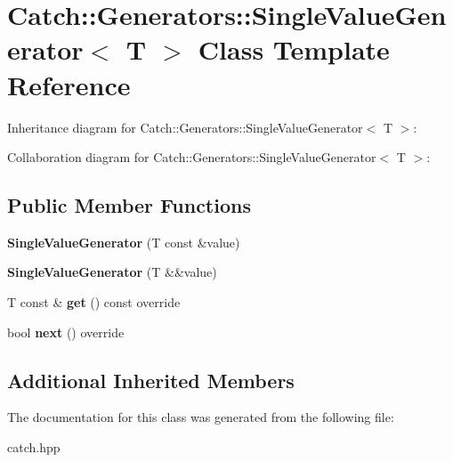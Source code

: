 \hypertarget{classCatch_1_1Generators_1_1SingleValueGenerator}{}\section{Catch\+:\+:Generators\+:\+:Single\+Value\+Generator$<$ T $>$ Class Template Reference}
\label{classCatch_1_1Generators_1_1SingleValueGenerator}


Inheritance diagram for Catch\+:\+:Generators\+:\+:Single\+Value\+Generator$<$ T $>$\+:


Collaboration diagram for Catch\+:\+:Generators\+:\+:Single\+Value\+Generator$<$ T $>$\+:
\subsection*{Public Member Functions}
\begin{DoxyCompactItemize}
\item 
\mbox{\label{classCatch_1_1Generators_1_1SingleValueGenerator_a4bed2ad14ffe04102d8135e2c82b3ace}} 
{\bfseries Single\+Value\+Generator} (T const \&value)
\item 
\mbox{\label{classCatch_1_1Generators_1_1SingleValueGenerator_a532140dd2d1a673692271bb76a661ebe}} 
{\bfseries Single\+Value\+Generator} (T \&\&value)
\item 
\mbox{\label{classCatch_1_1Generators_1_1SingleValueGenerator_a5142058c52131a2471e7307972f99b50}} 
T const  \& {\bfseries get} () const override
\item 
\mbox{\label{classCatch_1_1Generators_1_1SingleValueGenerator_a10833b34e3ccbc484624185712eb8b6e}} 
bool {\bfseries next} () override
\end{DoxyCompactItemize}
\subsection*{Additional Inherited Members}


The documentation for this class was generated from the following file\+:\begin{DoxyCompactItemize}
\item 
catch.\+hpp\end{DoxyCompactItemize}
